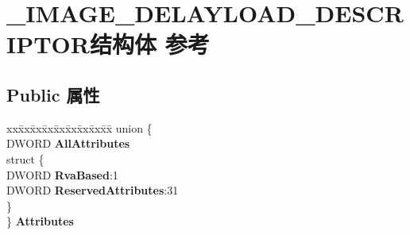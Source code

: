 \hypertarget{struct___i_m_a_g_e___d_e_l_a_y_l_o_a_d___d_e_s_c_r_i_p_t_o_r}{}\section{\+\_\+\+I\+M\+A\+G\+E\+\_\+\+D\+E\+L\+A\+Y\+L\+O\+A\+D\+\_\+\+D\+E\+S\+C\+R\+I\+P\+T\+O\+R结构体 参考}
\label{struct___i_m_a_g_e___d_e_l_a_y_l_o_a_d___d_e_s_c_r_i_p_t_o_r}
\subsection*{Public 属性}
\begin{DoxyCompactItemize}
\item 
\mbox{\label{struct___i_m_a_g_e___d_e_l_a_y_l_o_a_d___d_e_s_c_r_i_p_t_o_r_aa44249265b178796f93e0bc261780356}} 
\begin{tabbing}
xx\=xx\=xx\=xx\=xx\=xx\=xx\=xx\=xx\=\kill
union \{\\
\>DWORD {\bfseries AllAttributes}\\
\mbox{\label{union___i_m_a_g_e___d_e_l_a_y_l_o_a_d___d_e_s_c_r_i_p_t_o_r_1_1_0D3464_a0e42ce136e45bcd27b28699b284b9dfc}} 
\>struct \{\\
\>\>DWORD {\bfseries RvaBased}:1\\
\>\>DWORD {\bfseries ReservedAttributes}:31\\
\>\} \\
\} {\bfseries Attributes}\\


\end{tabbing}
\end{DoxyCompactItemize}
